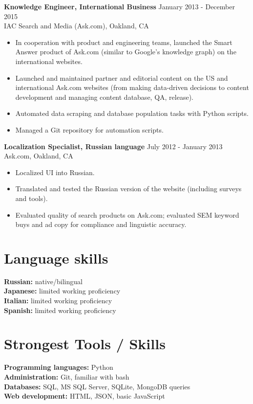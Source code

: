 \documentclass[10pt,line,letterpaper]{res}
\begin{document}
\begin{resume}
    {\bf Knowledge Engineer, International Business} \hfill January 2013 - December 2015 \\
    IAC Search and Media (Ask.com), Oakland, CA
    \begin{itemize} \itemsep -2pt
    \item In cooperation with product and engineering teams, launched the Smart Answer product of Ask.com (similar to Google's knowledge graph) on the international websites.
    \item Launched and maintained partner and editorial content on the US and international Ask.com websites (from making data-driven decisions to content development and managing content database, QA, release).
    \item Automated data scraping and database population tasks with Python scripts.
    \item Managed a Git repository for automation scripts.
    \end{itemize}

    {\bf Localization Specialist, Russian language} \hfill July 2012 - January 2013 \\
    Ask.com, Oakland, CA
    \begin{itemize} \itemsep -2pt
    \item Localized UI into Russian.
    \item Translated and tested the Russian version of the website (including surveys and tools).
    \item Evaluated quality of search products on Ask.com; evaluated SEM keyword buys and ad copy for compliance and linguistic accuracy.

    \end{itemize}

\section {Language skills}
    {\bf Russian:} native/bilingual \\
	{\bf Japanese:} limited working proficiency \\
    {\bf Italian:} limited working proficiency \\
    {\bf Spanish:} limited working proficiency \\

\section{Strongest Tools / Skills}
    {\bf Programming languages:} Python \\
    {\bf Administration:} Git, familiar with bash \\
    {\bf Databases:}  SQL, MS SQL Server, SQLite, MongoDB queries\\
    {\bf Web development:} HTML, JSON, basic JavaScript \\


\end{resume}
\end{document}
